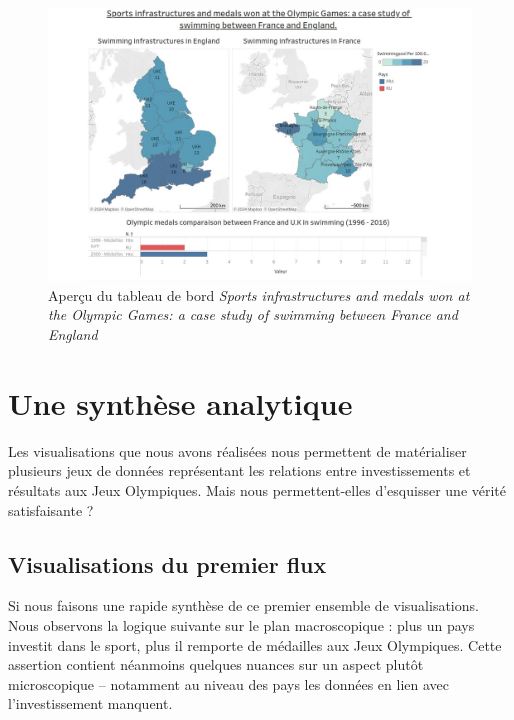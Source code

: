 \documentclass[hidelinks, 12pt]{report}
\begin{document}
\begin{center}
	\begin{figure}[H]
		\centering
		\setlength{\belowcaptionskip}{-35pt}
		\includegraphics[scale=0.35]{images/datavis-swim-tab.jpeg}
		\captionsetup{justification=centering}
		\caption{Aperçu du tableau de bord \textit{Sports infrastructures and medals won at the Olympic Games: a case study of swimming between France and England}}
	\end{figure}
\end{center}





%





\section{Une synthèse analytique}

Les visualisations que nous avons réalisées nous permettent de matérialiser plusieurs jeux de données représentant les relations entre investissements et résultats aux Jeux Olympiques. Mais nous permettent-elles d’esquisser une vérité satisfaisante ?

\subsection{Visualisations du premier flux}

\label{nuance}Si nous faisons une rapide synthèse de ce premier ensemble de visualisations. Nous observons la logique suivante sur le plan macroscopique : plus un pays investit dans le sport, plus il remporte de médailles aux Jeux Olympiques. Cette assertion contient néanmoins quelques nuances sur un aspect plutôt microscopique -- notamment au niveau des pays les données en lien avec l’investissement manquent.
\end{document}
